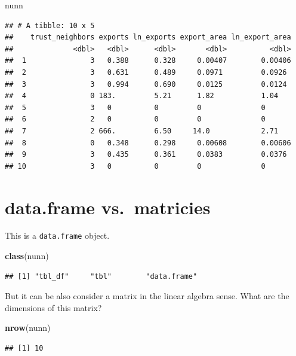 \documentclass[]{book}
\newenvironment{Shaded}{\begin{snugshade}}{\end{snugshade}}
\newcommand{\KeywordTok}[1]{\textcolor[rgb]{0.13,0.29,0.53}{\textbf{#1}}}
\newcommand{\NormalTok}[1]{#1}
\theoremstyle{definition}
\theoremstyle{definition}
\theoremstyle{definition}
\theoremstyle{remark}
\begin{document}
\begin{Shaded}
\begin{Highlighting}[]
\NormalTok{nunn}
\end{Highlighting}
\end{Shaded}

\begin{verbatim}
## # A tibble: 10 x 5
##    trust_neighbors exports ln_exports export_area ln_export_area
##              <dbl>   <dbl>      <dbl>       <dbl>          <dbl>
##  1               3   0.388      0.328     0.00407        0.00406
##  2               3   0.631      0.489     0.0971         0.0926 
##  3               3   0.994      0.690     0.0125         0.0124 
##  4               0 183.         5.21      1.82           1.04   
##  5               3   0          0         0              0      
##  6               2   0          0         0              0      
##  7               2 666.         6.50     14.0            2.71   
##  8               0   0.348      0.298     0.00608        0.00606
##  9               3   0.435      0.361     0.0383         0.0376 
## 10               3   0          0         0              0
\end{verbatim}

\section{data.frame vs.~matricies}\label{data.frame-vs.matricies}

This is a \texttt{data.frame} object.

\begin{Shaded}
\begin{Highlighting}[]
\KeywordTok{class}\NormalTok{(nunn)}
\end{Highlighting}
\end{Shaded}

\begin{verbatim}
## [1] "tbl_df"     "tbl"        "data.frame"
\end{verbatim}

But it can be also consider a matrix in the linear algebra sense. What
are the dimensions of this matrix?

\begin{Shaded}
\begin{Highlighting}[]
\KeywordTok{nrow}\NormalTok{(nunn)}
\end{Highlighting}
\end{Shaded}

\begin{verbatim}
## [1] 10
\end{verbatim}
\end{document}
